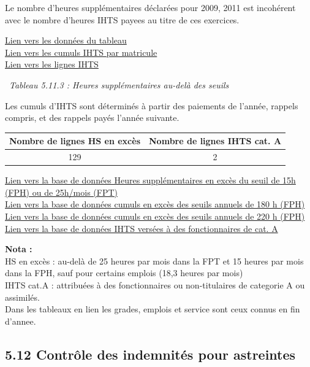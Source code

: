 Le nombre d'heures supplémentaires déclarées pour 2009, 2011 est
incohérent avec le nombre d'heures IHTS payees au titre de ces
exercices.

\href{../Bases/Reglementation/CumHS.csv}{Lien vers les données du
tableau}\\
\href{../Bases/Reglementation/lignes.IHTS.tot.csv}{Lien vers les cumuls
IHTS par matricule}\\
\href{../Bases/Reglementation/lignes.IHTS.csv}{Lien vers les lignes IHTS}

~\emph{Tableau 5.11.3 : Heures supplémentaires au-delà des seuils}

Les cumuls d'IHTS sont déterminés à partir des paiements de l'année,
rappels compris, et des rappels payés l'année suivante.

\begin{longtable}[]{@{}cc@{}}
\toprule
Nombre de lignes HS en excès & Nombre de lignes IHTS cat.
A\tabularnewline
\midrule
\endhead
129 & 2\tabularnewline
\bottomrule
\end{longtable}

\href{../Bases/Reglementation/HS.sup.25.csv}{Lien vers la base de données
Heures supplémentaires en excès du seuil de 15h (FPH) ou de 25h/mois
(FPT)}\\
\href{../Bases/Reglementation/Depassement.seuil.180h.csv}{Lien vers la base
de données cumuls en excès des seuils annuels de 180 h (FPH)}\\
\href{../Bases/Reglementation/Depassement.seuil.220h.csv}{Lien vers la base
de données cumuls en excès des seuils annuels de 220 h (FPH)}\\
\href{../Bases/Reglementation/ihts.cat.A.csv}{Lien vers la base de données
IHTS versées à des fonctionnaires de cat. A}

\textbf{Nota :}\\
HS en excès : au-delà de 25 heures par mois dans la FPT et 15 heures par
mois dans la FPH, sauf pour certains emplois (18,3 heures par mois)\\
IHTS cat.A : attribuées à des fonctionnaires ou non-titulaires de
categorie A ou assimilés.\\
Dans les tableaux en lien les grades, emplois et service sont ceux
connus en fin d'annee.

\hypertarget{controle-des-indemnites-pour-astreintes}{%
\subsection{5.12 Contrôle des indemnités pour
astreintes}\label{controle-des-indemnites-pour-astreintes}}

